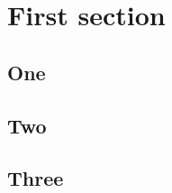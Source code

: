 \documentclass[12pt]{article}
\begin{document}
    \section{First section}
        \subsection{One}
            \lipsum[1-3]
        \subsection{Two}
            \lipsum[4-6]
        \subsection{Three}
            \lipsum[7-9]
\end{document}
